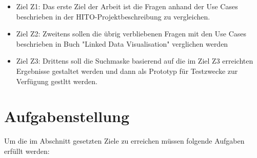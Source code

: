 \begin{itemize}
\item Ziel Z1: Das erste Ziel der Arbeit ist die Fragen anhand der Use Cases beschrieben in der HITO-Projektbeschreibung zu vergleichen. 
\item Ziel Z2: Zweitens sollen die übrig verbliebenen Fragen mit den Use Cases beschrieben in Buch "Linked Data Visualisation" verglichen werden
\item Ziel Z3: Drittens soll die Suchmaske basierend auf die im Ziel Z3 erreichten Ergebnisse gestaltet werden und dann als Prototyp für Testzwecke zur Verfügung gestltt werden.
\end{itemize}



\section{Aufgabenstellung}\label{sec:aufgabenstellung}

Um die im Abschnitt  gesetzten Ziele zu erreichen müssen folgende Aufgaben erfüllt werden:

